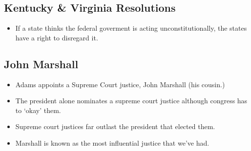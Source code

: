 \documentclass{article}
\begin{document}
      \subsection{Kentucky \& Virginia Resolutions}
        \begin{itemize}
          \item If a state thinks the federal goverment is acting unconstitutionally, the states have a right to disregard it. 
        \end{itemize}
      \subsection{John Marshall}
        \begin{itemize}
          \item Adams appoints a Supreme Court justice, John Marshall (his cousin.)
          \item The president alone nominates a supreme court justice although congress has to `okay' them.
          \item Supreme court justices far outlast the president that elected them.
          \item Marshall is known as the most influential justice that we've had.
        \end{itemize}
\end{document}
